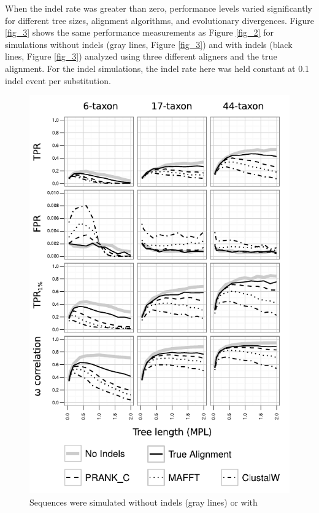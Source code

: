 \documentclass{article}
\begin{document}
When the indel rate was greater than zero, performance levels varied
significantly for different tree sizes, alignment algorithms, and
evolutionary divergences. Figure \ref{fig_3} shows the same
performance measurements as Figure \ref{fig_2} for simulations without
indels (gray lines, Figure \ref{fig_3}) and with indels (black lines,
Figure \ref{fig_3}) analyzed using three different aligners and the
true alignment. For the indel simulations, the indel rate here was held
constant at 0.1 indel event per substitution.
\begin{figure}[t]
\begin{center}
\includegraphics[scale=1.25]{fig3.pdf}
\end{center}
\caption{Sequences were simulated without indels (gray lines) or with
}
\end{figure}
\end{document}
